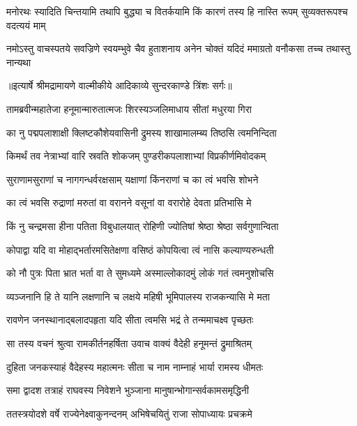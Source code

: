 \fourlineindentedshloka
{मनोरथः स्यादिति चिन्तयामि}
{तथापि बुद्ध्या च वितर्कयामि}
{किं कारणं तस्य हि नास्ति रूपम्}
{सुव्यक्तरूपश्च वदत्ययं माम्} %

\fourlineindentedshloka
{नमोऽस्तु वाचस्पतये सवज्रिणे}
{स्वयम्भुवे चैव हुताशनाय}
{अनेन चोक्तं यदिदं ममाग्रतो}
{वनौकसा तच्च तथास्तु नान्यथा} %


{॥इत्यार्षे श्रीमद्रामायणे वाल्मीकीये आदिकाव्ये सुन्दरकाण्डे त्रिंशः सर्गः॥}


\twolineshloka
{तामब्रवीन्महातेजा हनूमान्मारुतात्मजः}
{शिरस्यञ्जलिमाधाय सीतां मधुरया गिरा} %

\twolineshloka
{का नु पद्मपलाशाक्षी क्लिष्टकौशेयवासिनी}
{द्रुमस्य शाखामालम्ब्य तिष्ठसि त्वमनिन्दिता} %

\twolineshloka
{किमर्थं तव नेत्राभ्यां वारि स्रवति शोकजम्}
{पुण्डरीकपलाशाभ्यां विप्रकीर्णमिवोदकम्} %

\twolineshloka
{सुराणामसुराणां च नागगन्धर्वरक्षसाम्}
{यक्षाणां किंनराणां च का त्वं भवसि शोभने} %

\twolineshloka
{का त्वं भवसि रुद्राणां मरुतां वा वरानने}
{वसूनां वा वरारोहे देवता प्रतिभासि मे} %

\twolineshloka
{किं नु चन्द्रमसा हीना पतिता विबुधालयात्}
{रोहिणी ज्योतिषां श्रेष्ठा श्रेष्ठा सर्वगुणान्विता} %

\twolineshloka
{कोपाद्वा यदि वा मोहाद्भर्तारमसितेक्षणा}
{वसिष्ठं कोपयित्वा त्वं नासि कल्याण्यरुन्धती} %

\twolineshloka
{को नौ पुत्रः पिता भ्रात भर्ता वा ते सुमध्यमे}
{अस्माल्लोकादमुं लोकं गतं त्वमनुशोचसि} %

\twolineshloka
{व्यञ्जनानि हि ते यानि लक्षणानि च लक्षये}
{महिषी भूमिपालस्य राजकन्यासि मे मता} %

\twolineshloka
{रावणेन जनस्थानाद्बलादपहृता यदि}
{सीता त्वमसि भद्रं ते तन्ममाचक्ष्व पृच्छतः} %

\twolineshloka
{सा तस्य वचनं श्रुत्वा रामकीर्तनहर्षिता}
{उवाच वाक्यं वैदेही हनूमन्तं द्रुमाश्रितम्} %

\twolineshloka
{दुहिता जनकस्याहं वैदेहस्य महात्मनः}
{सीता च नाम नाम्नाहं भार्या रामस्य धीमतः} %

\twolineshloka
{समा द्वादश तत्राहं राघवस्य निवेशने}
{भुञ्जाना मानुषान्भोगान्सर्वकामसमृद्धिनी} %

\twolineshloka
{ततस्त्रयोदशे वर्षे राज्येनेक्ष्वाकुनन्दनम्}
{अभिषेचयितुं राजा सोपाध्यायः प्रचक्रमे} %

